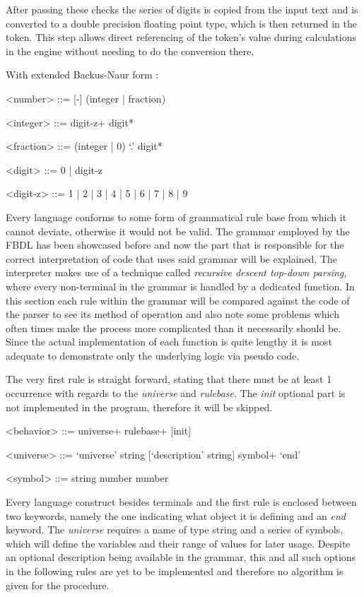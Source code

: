 After passing these checks the series of digits is copied from the input text and is converted to a double precision floating point type, which is then returned in the token. This step allows direct referencing of the token's value during calculations in the engine without needing to do the conversion there.

With extended Backus-Naur form :
\begin{grammar}
<number> ::=  [-]  (integer | fraction)

<integer> ::= digit-z+ digit*

<fraction> ::= (integer | 0) `.' digit*

<digit> ::= 0 | digit-z

<digit-z> ::= 1 | 2 | 3 | 4 | 5 | 6 | 7 | 8 | 9

\end{grammar}

Every language conforms to some form of grammatical rule base from which it cannot deviate, otherwise it would not be valid. The grammar employed by the FBDL has been showcased before and now the part that is responsible for the correct interpretation of code that uses said grammar will be explained. The interpreter makes use of a technique called \textit{recursive descent top-down parsing}, where every non-terminal in the grammar is handled by a dedicated function. In this section each rule within the grammar will be compared against the code of the parser to see its method of operation and also note some problems which often times make the process more complicated than it necessarily should be. Since the actual implementation of each function is quite lengthy it is most adequate to demonstrate only the underlying logic via pseudo code.

The very first rule is straight forward, stating that there must be at least 1 occurrence with regards to the \textit{universe} and \textit{rulebase}. The \textit{init} optional part is not implemented in the program, therefore it will be skipped.
\begin{grammar}
<behavior> ::= universe+ rulebase+ [init]

<universe> ::= `universe' string [`description' string] symbol+ `end'

<symbol> ::= string number number
\end{grammar}

Every language construct besides terminals and the first rule is enclosed between two keywords, namely the one indicating what object it is defining and an \textit{end} keyword. The \textit{universe} requires a name of type string and a series of symbols, which will define the variables and their range of values for later usage. Despite an optional description being available in the grammar, this and all such options in the following rules are yet to be implemented and therefore no algorithm is given for the procedure.

